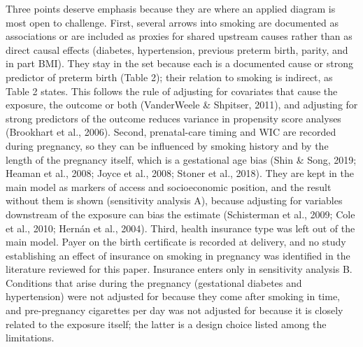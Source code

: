 \documentclass[11pt,letterpaper]{article}
\begin{document}
Three points deserve emphasis because they are where an applied diagram is most open to challenge. First, several arrows into smoking are documented as associations or are included as proxies for shared upstream causes rather than as direct causal effects (diabetes, hypertension, previous preterm birth, parity, and in part BMI). They stay in the set because each is a documented cause or strong predictor of preterm birth (Table 2); their relation to smoking is indirect, as Table 2 states. This follows the rule of adjusting for covariates that cause the exposure, the outcome or both (VanderWeele \& Shpitser, 2011), and adjusting for strong predictors of the outcome reduces variance in propensity score analyses (Brookhart et al., 2006). Second, prenatal-care timing and WIC are recorded during pregnancy, so they can be influenced by smoking history and by the length of the pregnancy itself, which is a gestational age bias (Shin \& Song, 2019; Heaman et al., 2008; Joyce et al., 2008; Stoner et al., 2018). They are kept in the main model as markers of access and socioeconomic position, and the result without them is shown (sensitivity analysis A), because adjusting for variables downstream of the exposure can bias the estimate (Schisterman et al., 2009; Cole et al., 2010; Hernán et al., 2004). Third, health insurance type was left out of the main model. Payer on the birth certificate is recorded at delivery, and no study establishing an effect of insurance on smoking in pregnancy was identified in the literature reviewed for this paper. Insurance enters only in sensitivity analysis B. Conditions that arise during the pregnancy (gestational diabetes and hypertension) were not adjusted for because they come after smoking in time, and pre-pregnancy cigarettes per day was not adjusted for because it is closely related to the exposure itself; the latter is a design choice listed among the limitations.
\end{document}
